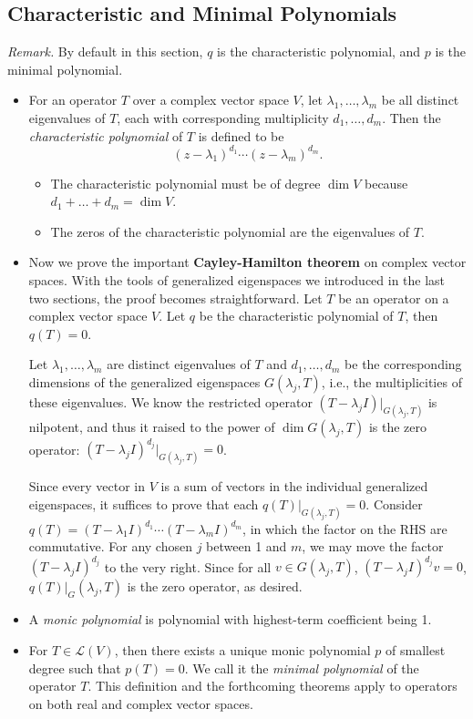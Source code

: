 \documentclass[11pt]{article}
\newcommand{\df}[1]{\textit{\textsf{#1}}}
\renewcommand{\d}{\dim}
\newcommand{\LV}{\mathcal{L}(V)}
\begin{document}
\subsection{Characteristic and Minimal Polynomials}
\textit{Remark.} By default in this section, $q$ is the characteristic polynomial, and $p$ is the minimal polynomial.
\begin{itemize}
    \item For an operator $T$ over a complex vector space $V$, let $\lambda_1, \dots, \lambda_m$ be all distinct eigenvalues of $T$, each with corresponding multiplicity $d_1,\dots, d_m$. Then the \df{characteristic polynomial} of $T$ is defined to be \[(z-\lambda_1)^{d_1}\cdots (z-\lambda_m)^{d_m}.\]
    \begin{itemize}
        \item The characteristic polynomial must be of degree $\d V$ because $d_1+\dots+d_m = \d V$.
        \item The zeros of the characteristic polynomial are the eigenvalues of $T$.
    \end{itemize}
    \item Now we prove the important \textbf{Cayley-Hamilton theorem} on complex vector spaces. With the tools of generalized eigenspaces we introduced in the last two sections, the proof becomes straightforward. Let $T$ be an operator on a complex vector space $V$. Let $q$ be the characteristic polynomial of $T$, then $q(T) = 0$.

    Let $\lambda_1,\dots,\lambda_m$ are distinct eigenvalues of $T$ and $d_1,\dots,d_m$ be the corresponding dimensions of the generalized eigenspaces $G(\lambda_j,T)$, i.e., the multiplicities of these eigenvalues. We know the restricted operator $(T - \lambda_j I)|_{G(\lambda_j,T)}$ is nilpotent, and thus it raised to the power of $\d G(\lambda_j,T)$ is the zero operator: $(T - \lambda_j I)^{d_j}|_{G(\lambda_j,T)} = 0$.

    Since every vector in $V$ is a sum of vectors in the individual generalized eigenspaces, it suffices to prove that each $q(T)|_{G(\lambda_j,T)} = 0$. Consider $q(T) = (T - \lambda_1 I)^{d_1} \cdots (T - \lambda_m I)^{d_m}$, in which the factor on the RHS are commutative. For any chosen $j$ between 1 and $m$, we may move the factor $(T - \lambda_j I)^{d_j}$ to the very right. Since for all $v \in G(\lambda_j,T)$, $(T - \lambda_j I)^{d_j}v = 0$, $q(T)|_G(\lambda_j,T)$ is the zero operator, as desired.

    \item A \df{monic polynomial} is polynomial with highest-term coefficient being 1.
    \item For $T \in \LV$, then there exists a unique monic polynomial $p$ of smallest degree such that $p(T)=0$. We call it the \df{minimal polynomial} of the operator $T$. This definition and the forthcoming theorems apply to operators on both real and complex vector spaces.
    

\end{itemize}
\end{document}
